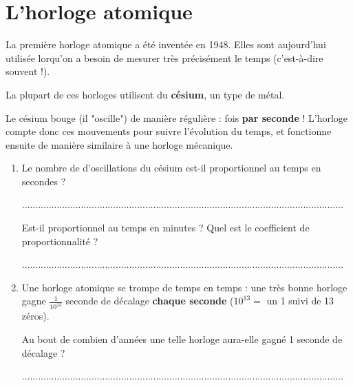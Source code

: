 \documentclass[a4paper,11pt]{article}
\begin{document}
\newpage

\section{L'horloge atomique}

\begin{greybox}[frametitle={Point historique}]
	La première horloge atomique a été inventée en 1948. Elles sont aujourd'hui utilisée lorqu'on a besoin de mesurer très précisément le temps (c'est-à-dire souvent !).
\end{greybox}

\begin{attention}[frametitle={Comment ça fonctionne ?}]
	La plupart de ces horloges utilisent du \textbf{césium}, un type de métal.

	Le césium bouge (il "oscille") de manière régulière :  fois \textbf{par seconde} ! L'horloge compte donc ces mouvements pour suivre l'évolution du temps, et fonctionne ensuite de manière similaire à une horloge mécanique.
\end{attention}

\begin{enumerate}
	\item Le nombre de d'oscillations du césium est-il proportionnel au temps en secondes ? \vspace{0.6em}

	      ........................................................................................................................

	      Est-il proportionnel au temps en minutes ? Quel est le coefficient de proportionnalité ? \vspace{0.6em}

	      ........................................................................................................................
	\item Une horloge atomique se trompe de temps en temps : une très bonne horloge gagne $\frac{1}{10^{13}}$ seconde de décalage \textbf{chaque seconde} ($10^{13} = $ un 1 suivi de 13 zéros).

	      Au bout de combien d'années une telle horloge aura-elle gagné 1 seconde de décalage ? \vspace{0.6em}

	      ........................................................................................................................
\end{enumerate}
\end{document}

